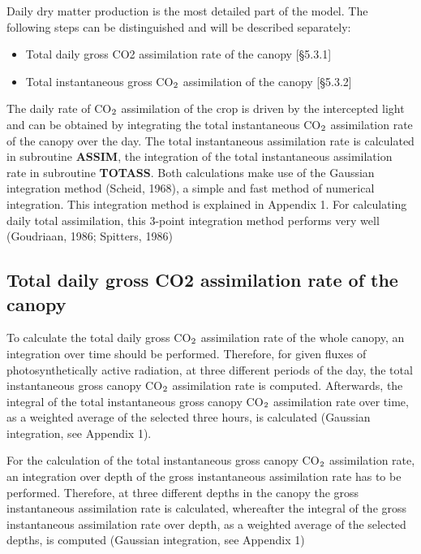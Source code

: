 Daily dry matter production is the most detailed part of the model. The following steps
can be distinguished and will be described separately:
\begin{itemize}
\item Total daily gross CO2 assimilation rate of the canopy [\S 5.3.1]
\item Total instantaneous gross CO$_{{\rm 2}}$ assimilation of the canopy [\S 5.3.2]
\end{itemize}
 
The daily rate of CO$_{{\rm 2}}$ assimilation of the crop is driven by the intercepted light and can
be obtained by integrating the total instanta\-neous CO$_{{\rm 2}}$ assimilation rate of the canopy over
the day. The total instantaneous assimilation rate is calculated in subrou\-tine {\bf ASSIM}, the
integra\-tion of the total instantaneous assimilation rate in subrou\-tine {\bf TOTASS}. Both
calcula\-tions make use of the Gaussian integration method (Scheid, 1968), a simple and
fast method of numerical integration. This integration method is explained in Appendix 1.
For calculat\-ing daily total assimilation, this 3-point integration method performs very well
(Goudria\-an, 1986; Spitters, 1986)

\subsection{Total daily gross CO2 assimilation rate of the canopy}

To calculate the total daily gross CO$_{{\rm 2}}$ assimilation rate of the whole canopy, an integra\-tion over time should be performed. Therefore, for given fluxes of photosyntheti\-cally
active radiation, at three different periods of the day, the total instantaneous gross canopy
CO$_{{\rm 2}}$ assimila\-tion rate is computed. Afterwards, the integral of the total instantaneous
gross canopy CO$_{{\rm 2}}$ assimila\-tion rate over time, as a weighted average of the selected three
hours, is calculat\-ed (Gaussian integration, see Appendix 1).

For the calculation of the total instantaneous gross canopy CO$_{{\rm 2}}$ assimilation rate, an
integra\-tion over depth of the gross instantaneous assimilation rate has to be per\-formed.
Therefore, at three different depths in the canopy the gross instanta\-neous assimilation rate
is calculated, whereafter the integral of the gross instantaneous assimila\-tion rate over
depth, as a weighted average of the selected depths, is computed (Gaussian integration,
see Appendix 1)

